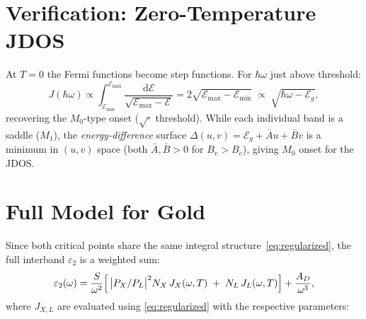 \documentclass[11pt, a4paper]{article}
\newcommand{\E}{\mathcal{E}}
\newcommand{\Eg}{\E_g}
\newcommand{\Emax}{\E_{\max}}
\newcommand{\Emin}{\E_{\min}}
\newcommand{\Abar}{\bar{A}}
\newcommand{\Bbar}{\bar{B}}
\newcommand{\hw}{\hbar\omega}
\newcommand{\dd}{\mathrm{d}}
\begin{document}
\section{Verification: Zero-Temperature JDOS}

At $T = 0$ the Fermi functions become step functions. For $\hw$ just above threshold:
\begin{equation}
    J(\hw) \propto \int_{\Emin}^{\Emax} \frac{\dd\E}{\sqrt{\Emax - \E}}
    = 2\sqrt{\Emax - \Emin}
    \;\propto\; \sqrt{\hw - \Eg},
\end{equation}
recovering the $M_0$-type onset ($\sqrt{\cdot}$ threshold). While each individual band is a saddle ($M_1$), the \emph{energy-difference} surface $\Delta(u,v) = \Eg + \Abar u + \Bbar v$ is a minimum in $(u,v)$ space (both $\Abar, \Bbar > 0$ for $B_v > B_c$), giving $M_0$ onset for the JDOS.

\section{Full Model for Gold}

Since both critical points share the same integral structure~\eqref{eq:regularized}, the full interband $\varepsilon_2$ is a weighted sum:
\begin{equation}\label{eq:full-model}
    \varepsilon_2(\omega) = \frac{S}{\omega^2}
    \Bigl[\,\bigl|P_X/P_L\bigr|^2 N_X\, J_X(\omega,T)
    \;+\; N_L\, J_L(\omega,T)\Bigr]
    + \frac{A_D}{\omega^3},
\end{equation}
where $J_{X,L}$ are evaluated using \eqref{eq:regularized} with the respective parameters:
\end{document}
